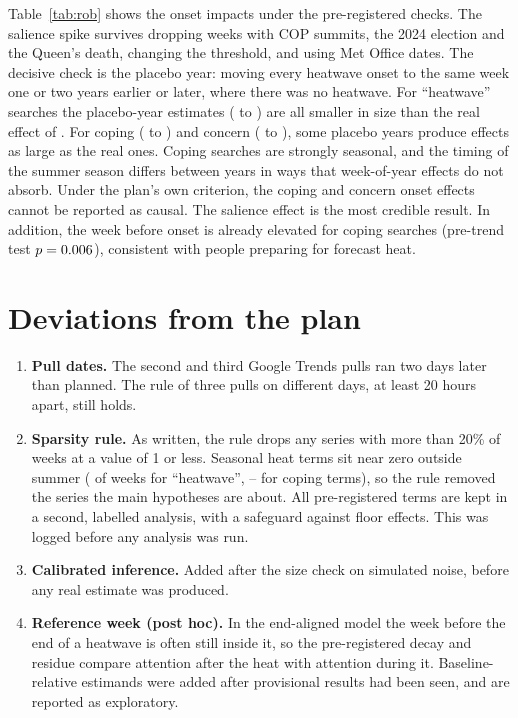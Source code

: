 \documentclass[11pt,a4paper]{article}
\begin{document}
Table~\ref{tab:rob} shows the onset impacts under the pre-registered checks. The salience spike survives dropping weeks with COP summits, the 2024 election and the Queen's death, changing the threshold, and using Met Office dates. The decisive check is the placebo year: moving every heatwave onset to the same week one or two years earlier or later, where there was no heatwave. For ``heatwave'' searches the placebo-year estimates (\PYSalMin{} to \PYSalMax) are all smaller in size than the real effect of \ImpSal. For coping (\PYCopMin{} to \PYCopMax) and concern (\PYConMin{} to \PYConMax), some placebo years produce effects as large as the real ones. Coping searches are strongly seasonal, and the timing of the summer season differs between years in ways that week-of-year effects do not absorb. Under the plan's own criterion, the coping and concern onset effects cannot be reported as causal. The salience effect is the most credible result. In addition, the week before onset is already elevated for coping searches (pre-trend test $p=0.006$), consistent with people preparing for forecast heat.

\begin{table}[t]
\centering
\small
\caption{Onset impact (log points) under pre-registered robustness and placebo checks. Placebo-year rows move each heatwave onset to the same week in another year.}
\label{tab:rob}

\end{table}

\section{Deviations from the plan}
\label{sec:deviations}

\begin{enumerate}
\item \textbf{Pull dates.} The second and third Google Trends pulls ran two days later than planned. The rule of three pulls on different days, at least 20 hours apart, still holds.
\item \textbf{Sparsity rule.} As written, the rule drops any series with more than 20\% of weeks at a value of 1 or less. Seasonal heat terms sit near zero outside summer (\SparseHeatwave{} of weeks for ``heatwave'', \SparseCopingMin--\SparseCopingMax{} for coping terms), so the rule removed the series the main hypotheses are about. All pre-registered terms are kept in a second, labelled analysis, with a safeguard against floor effects. This was logged before any analysis was run.
\item \textbf{Calibrated inference.} Added after the size check on simulated noise, before any real estimate was produced.
\item \textbf{Reference week (post hoc).} In the end-aligned model the week before the end of a heatwave is often still inside it, so the pre-registered decay and residue compare attention after the heat with attention during it. Baseline-relative estimands were added after provisional results had been seen, and are reported as exploratory.
\end{enumerate}
\end{document}
